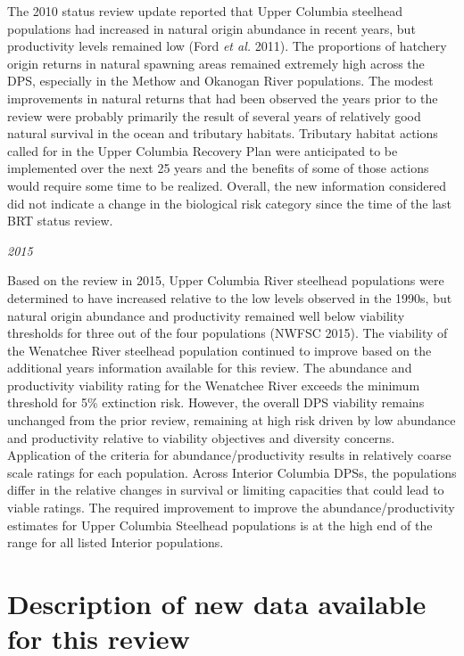 \documentclass[
  letterpaper,
  oneside,
  open=any]{scrbook}
\begin{document}
The 2010 status review update reported that Upper Columbia steelhead
populations had increased in natural origin abundance in recent years,
but productivity levels remained low (Ford \emph{et al.} 2011). The
proportions of hatchery origin returns in natural spawning areas
remained extremely high across the DPS, especially in the Methow and
Okanogan River populations. The modest improvements in natural returns
that had been observed the years prior to the review were probably
primarily the result of several years of relatively good natural
survival in the ocean and tributary habitats. Tributary habitat actions
called for in the Upper Columbia Recovery Plan were anticipated to be
implemented over the next 25 years and the benefits of some of those
actions would require some time to be realized. Overall, the new
information considered did not indicate a change in the biological risk
category since the time of the last BRT status review.

\emph{2015}

Based on the review in 2015, Upper Columbia River steelhead populations
were determined to have increased relative to the low levels observed in
the 1990s, but natural origin abundance and productivity remained well
below viability thresholds for three out of the four populations (NWFSC
2015). The viability of the Wenatchee River steelhead population
continued to improve based on the additional years information available
for this review. The abundance and productivity viability rating for the
Wenatchee River exceeds the minimum threshold for 5\% extinction risk.
However, the overall DPS viability remains unchanged from the prior
review, remaining at high risk driven by low abundance and productivity
relative to viability objectives and diversity concerns. Application of
the criteria for abundance/productivity results in relatively coarse
scale ratings for each population. Across Interior Columbia DPSs, the
populations differ in the relative changes in survival or limiting
capacities that could lead to viable ratings. The required improvement
to improve the abundance/productivity estimates for Upper Columbia
Steelhead populations is at the high end of the range for all listed
Interior populations.

\hypertarget{description-of-new-data-available-for-this-review}{%
\section{Description of new data available for this
review}\label{description-of-new-data-available-for-this-review}}
\end{document}
